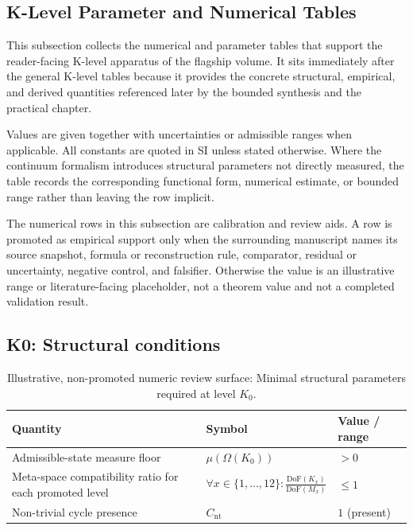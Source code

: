 
\subsection{K-Level Parameter and Numerical Tables}
\label{app:synthesis-constants-and-parameters}

This subsection collects the numerical and parameter tables that support the
reader-facing K-level apparatus of the flagship volume. It sits immediately
after the general K-level tables because it provides the concrete structural,
empirical, and derived quantities referenced later by the bounded synthesis and the
practical chapter.

Values are given together with uncertainties or admissible ranges when
applicable. All constants are quoted in SI unless stated otherwise. Where the
continuum formalism introduces structural parameters not directly measured, the
table records the corresponding functional form, numerical estimate, or bounded
range rather than leaving the row implicit.

The numerical rows in this subsection are calibration and review aids. A row is promoted as empirical support only when the surrounding manuscript names its source snapshot, formula or reconstruction rule, comparator, residual or uncertainty, negative control, and falsifier. Otherwise the value is an illustrative range or literature-facing placeholder, not a theorem value and not a completed validation result.

\begingroup
\footnotesize
\RaggedRight
\setlength{\tabcolsep}{4pt}



\subsection*{K0: Structural conditions}

\begin{table}[htbp]
  \centering
  \caption{Illustrative, non-promoted numeric review surface: Minimal structural parameters required at level \(K_0\).}
  \label{tab:k0-structural-parameters}
\begin{tabular}{@{}L{0.44\textwidth}L{0.16\textwidth}L{0.23\textwidth}@{}}
    \hline
    Quantity & Symbol & Value / range \\
    \hline
    Admissible-state measure floor & \(\mu(\Omega(K_0))\)
        & \(> 0\) \\
    Meta-space compatibility ratio for each promoted level & \(\forall x \in \{1,\dots,12\}: \frac{\mathrm{DoF}(K_x)}{\mathrm{DoF}(M_x)}\)
        & \(\leq 1\) \\
    Non-trivial cycle presence & \(C_{\mathrm{nt}}\)
        & \(1\) (present) \\
    \hline
\end{tabular}
\end{table}

